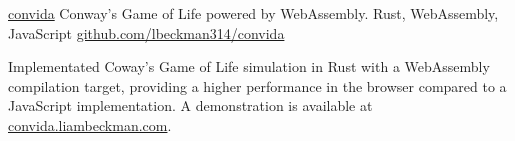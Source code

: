 \showoff
{\textcolor{my-blue}{\href{https://convida.liambeckman.com/}{convida}}}
{Conway's Game of Life powered by WebAssembly.}
{Rust, WebAssembly, JavaScript}
{\textcolor{my-blue}{\href{https://github.com/lbeckman314/convida}{github.com/lbeckman314/convida}}}

Implementated Coway's Game of Life simulation in Rust with a WebAssembly compilation target, providing a higher performance in the browser compared to a JavaScript implementation. A demonstration is available at \textcolor{my-blue}{\href{https://convida.liambeckman.com}{convida.liambeckman.com}}.


